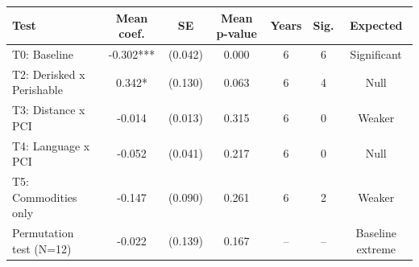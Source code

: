 \begin{tabular}{lcccccc}
\toprule
Test & Mean coef. & SE & Mean p-value & Years & Sig. & Expected \\
\midrule
T0: Baseline & -0.302*** & (0.042) & 0.000 & 6 & 6 & Significant \\
T2: Derisked x Perishable & 0.342* & (0.130) & 0.063 & 6 & 4 & Null \\
T3: Distance x PCI & -0.014 & (0.013) & 0.315 & 6 & 0 & Weaker \\
T4: Language x PCI & -0.052 & (0.041) & 0.217 & 6 & 0 & Null \\
T5: Commodities only & -0.147 & (0.090) & 0.261 & 6 & 2 & Weaker \\
\midrule
Permutation test (N=12) & -0.022 & (0.139) & 0.167 & -- & -- & Baseline extreme \\
\bottomrule
\end{tabular}